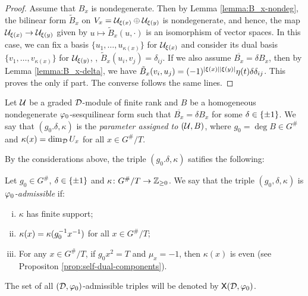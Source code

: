 \begin{proof}
    Assume that $B_x$ is nondegenerate. 
    Then by Lemma \ref{lemma:B_x-nondeg}, the bilinear form $\tilde B_x$ on $V_x = \mathcal U_{\xi(x)} \oplus \mathcal U_{\xi(y)}$ is nondegenerate, and hence, the map $\mathcal U_{\xi(x)} \to \mathcal U_{\xi(y)}$ given by $u \mapsto \tilde B_x (u, \cdot)$  is an isomorphism of vector spaces. 
    In this case, we can fix a basis $\{u_1, \ldots, u_{\kappa(x)} \}$ for $\mathcal U_{\xi(x)}$ and consider its dual basis $\{v_1, \ldots, v_{\kappa(x)} \}$ for $\mathcal U_{\xi(y)}$, \ie, $\tilde B_x (u_i, v_j) = \delta_{ij}$. 
    If we also assume $\overline{B_x} = \delta B_x$, then by Lemma \ref{lemma:B_x-delta}, we have $\tilde B_x (v_i, u_j) = (-1)^{|\xi(x)||\xi(y)|} \eta(t) \delta \delta_{ij}$. 
    This proves the only if part. 
    The converse follows the same lines. 
\end{proof}

\begin{defi}\label{def:parameter-of-(U,B)}
    Let $\mathcal U$ be a graded $\mathcal{D}$-module of finite rank and $B$ be a homogeneous nondegenerate $\varphi_0$-sesquilinear form such that $\overline{B_x} = \delta B_x$ for some $\delta \in \{ \pm 1 \}$. 
    We say that $(g_0. \delta, \kappa)$ is the \emph{parameter assigned to $(\mathcal U, B)$}, where $g_0 = \deg B \in G^\#$ and $\kappa(x) = \dim_{\mathcal{D}} U_x$ for all $x \in G^\#/T$. 
\end{defi}

By the considerations above, the triple $(g_0. \delta, \kappa)$ satifies the following: 

\begin{defi}
    Let $g_0 \in G^\#$, $\delta \in \{ \pm 1 \}$ and $\kappa\colon G^\#/T \to \mathbb{Z}_{\geq 0}$. 
    We say that the triple $(g_0, \delta, \kappa)$ is \emph{$\varphi_0$-admissible} if:
    \begin{enumerate}[(i)]
        \item $\kappa$ has finite support; \label{item:kappa-finite-support}
        \item $\kappa(x) = \kappa(g_0^{-1} x^{-1})$ for all $x \in G^\#/T$; \label{item:kappa-duality}
        \item For any $x\in G^\#/T$, if $g_0 x^2 = T$ and $\mu_x = -1$, then $\kappa (x)$ is even (see Propositon \ref{prop:self-dual-components}). \label{item:kappa-parity}
    \end{enumerate}
    The set of all $(\mathcal{D}, \varphi_0)$-admissible triples will be denoted by $\mathsf{X}(\mathcal{D}, \varphi_0)$.
\end{defi}

